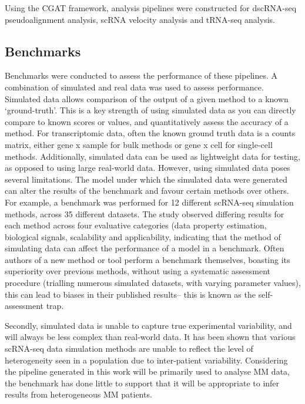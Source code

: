 Using the CGAT framework, analysis pipelines were constructed for dscRNA-seq pseudoalignment analysis, scRNA velocity analysis and tRNA-seq analysis.

\subsection{Benchmarks}

Benchmarks were conducted to assess the performance of these pipelines.
A combination of simulated and real data was used to assess performance.
Simulated data allows comparison of the output of a given method to a known `ground-truth'.
This is a key strength of using simulated data as you can directly compare to known scores or values, and quantitatively assess the accuracy of a method.
For transcriptomic data, often the known ground truth data is a counts matrix, either gene x sample for bulk methods or gene x cell for single-cell methods.
Additionally, simulated data can be used as lightweight data for testing, as opposed to using large real-world data. However, using simulated data poses several limitations.
The model under which the simulated data were generated can alter the results of the benchmark and favour certain methods over others.
For example, a benchmark was performed for 12 different scRNA-seq simulation methods, across 35 different datasets\cite{cao2021benchmark}.
The study observed differing results for each method across four evaluative categories (data property estimation, biological signals, scalability and applicability\cite{cao2021benchmark}, indicating that the method of simulating data can affect the performance of a model in a benchmark.
Often authors of a new method or tool perform a benchmark themselves, boasting its superiority over previous methods, without using a systematic assessment procedure (trialling numerous simulated datasets, with varying parameter values), this can lead to biases in their published results-- this is known as the self-assessment trap\cite{mangul2019systematic}.

Secondly, simulated data is unable to capture true experimental variability, and will always be less complex than real-world data\cite{mangul2019systematic}.
It has been shown that various scRNA-seq data simulation methods are unable to reflect the level of heterogeneity seen in a population due to inter-patient variability\cite{cao2021benchmark}.
Considering the pipeline generated in this work will be primarily used to analyse MM data, the benchmark has done little to support that it will be appropriate to infer results from heterogeneous MM patients.

